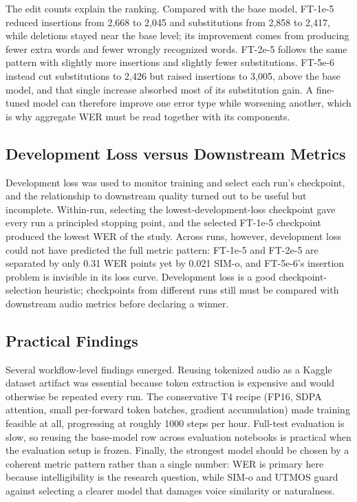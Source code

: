 \documentclass[sigconf,nonacm]{acmart}
\begin{document}
The edit counts explain the ranking. Compared with the base model, FT-1e-5 reduced insertions from 2,668 to 2,045 and substitutions from 2,858 to 2,417, while deletions stayed near the base level; its improvement comes from producing fewer extra words and fewer wrongly recognized words. FT-2e-5 follows the same pattern with slightly more insertions and slightly fewer substitutions. FT-5e-6 instead cut substitutions to 2,426 but raised insertions to 3,005, above the base model, and that single increase absorbed most of its substitution gain. A fine-tuned model can therefore improve one error type while worsening another, which is why aggregate WER must be read together with its components.

\subsection{Development Loss versus Downstream Metrics}

Development loss was used to monitor training and select each run's checkpoint, and the relationship to downstream quality turned out to be useful but incomplete. Within-run, selecting the lowest-development-loss checkpoint gave every run a principled stopping point, and the selected FT-1e-5 checkpoint produced the lowest WER of the study. Across runs, however, development loss could not have predicted the full metric pattern: FT-1e-5 and FT-2e-5 are separated by only 0.31 WER points yet by 0.021 SIM-o, and FT-5e-6's insertion problem is invisible in its loss curve. Development loss is a good checkpoint-selection heuristic; checkpoints from different runs still must be compared with downstream audio metrics before declaring a winner.

\subsection{Practical Findings}

Several workflow-level findings emerged. Reusing tokenized audio as a Kaggle dataset artifact was essential because token extraction is expensive and would otherwise be repeated every run. The conservative T4 recipe (FP16, SDPA attention, small per-forward token batches, gradient accumulation) made training feasible at all, progressing at roughly 1000 steps per hour. Full-test evaluation is slow, so reusing the base-model row across evaluation notebooks is practical when the evaluation setup is frozen. Finally, the strongest model should be chosen by a coherent metric pattern rather than a single number: WER is primary here because intelligibility is the research question, while SIM-o and UTMOS guard against selecting a clearer model that damages voice similarity or naturalness.
\end{document}
